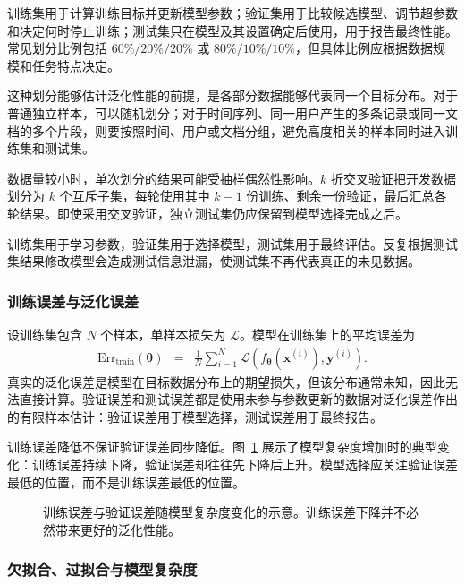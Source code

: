 训练集用于计算训练目标并更新模型参数；验证集用于比较候选模型、调节超参数和决定何时停止训练；测试集只在模型及其设置确定后使用，用于报告最终性能。常见划分比例包括 $60\%/20\%/20\%$ 或 $80\%/10\%/10\%$，但具体比例应根据数据规模和任务特点决定。

这种划分能够估计泛化性能的前提，是各部分数据能够代表同一个目标分布。对于普通独立样本，可以随机划分；对于时间序列、同一用户产生的多条记录或同一文档的多个片段，则要按照时间、用户或文档分组，避免高度相关的样本同时进入训练集和测试集。

数据量较小时，单次划分的结果可能受抽样偶然性影响。$k$ 折交叉验证把开发数据划分为 $k$ 个互斥子集，每轮使用其中 $k-1$ 份训练、剩余一份验证，最后汇总各轮结果。即使采用交叉验证，独立测试集仍应保留到模型选择完成之后。

\begin{importantnote}
  训练集用于学习参数，验证集用于选择模型，测试集用于最终评估。反复根据测试集结果修改模型会造成测试信息泄漏，使测试集不再代表真正的未见数据。
\end{importantnote}

\subsubsection{训练误差与泛化误差}

设训练集包含 $N$ 个样本，单样本损失为 $\mathcal{L}$。模型在训练集上的平均误差为
\begin{eqnarray}
\mathrm{Err}_{\mathrm{train}}(\boldsymbol{\theta})
& = &
\frac{1}{N}
\sum_{i=1}^{N}
\mathcal{L}\!\left(
f_{\boldsymbol{\theta}}(\mathbf{x}^{(i)}),
\mathbf{y}^{(i)}
\right).
\end{eqnarray}
真实的泛化误差是模型在目标数据分布上的期望损失，但该分布通常未知，因此无法直接计算。验证误差和测试误差都是使用未参与参数更新的数据对泛化误差作出的有限样本估计：验证误差用于模型选择，测试误差用于最终报告。

训练误差降低不保证验证误差同步降低。图~\ref{fig:aml-train-test-error} 展示了模型复杂度增加时的典型变化：训练误差持续下降，验证误差却往往先下降后上升。模型选择应关注验证误差最低的位置，而不是训练误差最低的位置。

\begin{figure}[htbp]
  \centering
  
  \caption{训练误差与验证误差随模型复杂度变化的示意。训练误差下降并不必然带来更好的泛化性能。}
  \label{fig:aml-train-test-error}
\end{figure}

\subsubsection{欠拟合、过拟合与模型复杂度}

